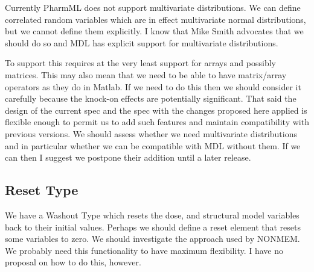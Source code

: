 \documentclass[a4paper,11pt]{article}
\newcommand{\pharmml}{PharmML\xspace}
\begin{document}
Currently \pharmml does not support multivariate distributions. We can
define correlated random variables which are in effect multivariate
normal distributions, but we cannot define them explicitly. I know
that Mike Smith advocates that we should do so and MDL has explicit
support for multivariate distributions.

To support this requires at the very least support for arrays and
possibly matrices. This may also mean that we need to be able to have
matrix/array operators as they do in Matlab. If we need to do this
then we should consider it carefully because the knock-on effects are
potentially significant. That said the design of the current
spec and the spec with the changes proposed here applied is flexible
enough to permit us to add such features and maintain compatibility
with previous versions. We should assess whether we need multivariate
distributions and in particular whether we can be compatible with MDL
without them. If we can then I suggest we postpone their addition
until a later release.

\subsection{Reset Type}

We have a Washout Type which resets the dose, and structural model
variables back to their initial values. Perhaps we should define a
reset element that resets some variables to zero. We should investigate
the approach used by NONMEM. We probably need this
functionality to have maximum flexibility. I have no proposal on how
to do this, however.
\end{document}
